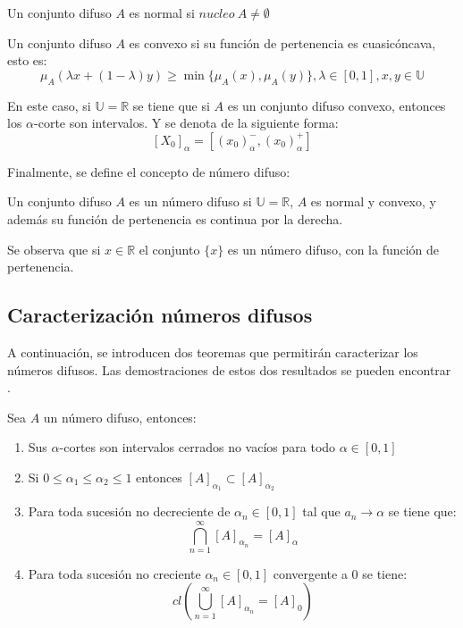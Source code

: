 \begin{definicion}
  \label{def:difuso_normal}
  Un conjunto difuso $A$ es normal si $nucleo ~ A \neq \emptyset$
\end{definicion}

\begin{definicion}
  \label{def:difuso_convexo}
  Un conjunto difuso $A$ es convexo si su función de pertenencia es cuasicóncava, esto es:
  \[
  \mu_A(\lambda x + (1-\lambda)y) \geq \min{\{\mu_A(x), \mu_A(y)\}}, \lambda \in [0, 1], x, y \in \mathbb{U}
  \]
\end{definicion}

En este caso, si $\mathbb{U}=\mathbb{R}$ se tiene que si $A$ es un conjunto difuso convexo, entonces los $\alpha$-corte son intervalos. Y se denota de la siguiente forma:
\[
  [X_0]_\alpha = [(x_0)_\alpha^- , (x_0)_\alpha^+]
  \]

  Finalmente, se define el concepto de número difuso:

  \begin{definicion}
    \label{def:numero_difuso}
    Un conjunto difuso $A$ es un número difuso si $\mathbb{U}=\mathbb{R}$, $A$ es normal y convexo, y además su función de pertenencia es continua por la derecha.
  \end{definicion}


  Se observa que si $x \in \mathbb{R}$ el conjunto $\{x\}$ es un número difuso, con la función de pertenencia.


  \subsection{Caracterización números difusos}
  A continuación, se introducen dos teoremas que permitirán caracterizar los números difusos. Las demostraciones de estos dos resultados se pueden encontrar \cite{apuntesfuzzy}.

  \begin{teorema}
    Sea $A$ un número difuso, entonces:
    \begin{enumerate}
    \item Sus $\alpha$-cortes son intervalos cerrados no vacíos para todo $\alpha \in [0, 1]$
    \item Si $0 \leq \alpha_1 \leq \alpha_2 \leq 1$ entonces $[A]_{\alpha_1} \subset [A]_{\alpha_2}$
    \item Para toda sucesión no decreciente de $\alpha_n \in [0, 1]$ tal que $a_n \longrightarrow \alpha$ se tiene que:
      \[
      \bigcap^\infty_{n=1} [A]_{\alpha_n} = [A]_\alpha
      \]
    \item Para toda sucesión no creciente $\alpha_n \in [0, 1]$ convergente a $0$ se tiene:
      \[
      cl\left(
      \bigcup^\infty_{n=1} [A]_{\alpha_n} = [A]_0
      \right)
      \]
    \end{enumerate}
  \end{teorema}

